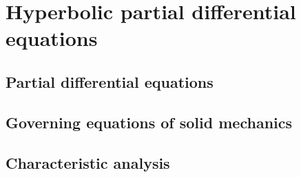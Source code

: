 \chapter{Hyperbolic partial differential equations}
\newpage
\section{Partial differential equations}
\label{sec:PDEs}


\section{Governing equations of solid mechanics}
\label{sec:solidMech_equations}



\section{Characteristic analysis}
\label{sec:characteristic_analysis}



%




